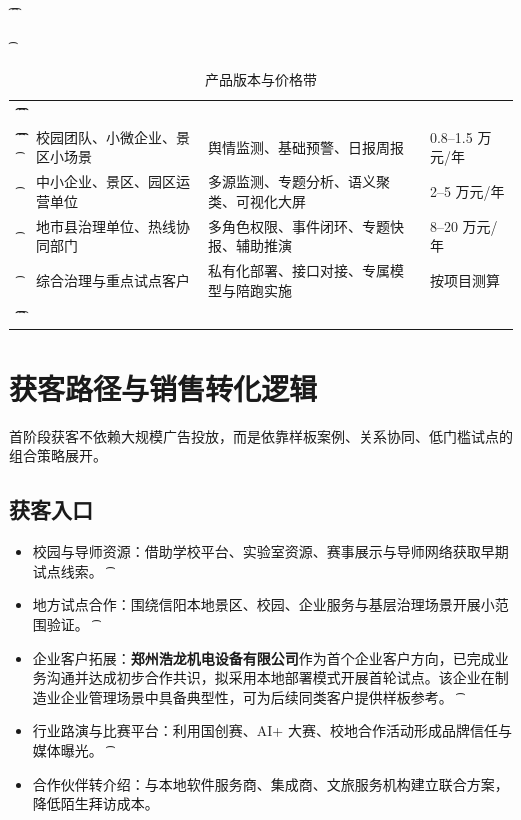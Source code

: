 \begin{table}[htbp]
	\t\centering
	\t\caption{产品版本与价格带}
	\t\begin{tabularx}{\textwidth}{|L{2.3cm}L{2.6cm}YL{2.4cm}|}
		\t\t\toprule
		\t\t{} &   &        &  \\
		\t\t\midrule
		\t\t{}
		\t{}          & 校园团队、小微企业、景区小场景 & 舆情监测、基础预警、日报周报       & 0.8--1.5 万元/年 \\
		\t{}          & 中小企业、景区、园区运营单位  & 多源监测、专题分析、语义聚类、可视化大屏 & 2--5 万元/年     \\
		\t{}          & 地市县治理单位、热线协同部门  & 多角色权限、事件闭环、专题快报、辅助推演 & 8--20 万元/年    \\
		\t{}          & 综合治理与重点试点客户     & 私有化部署、接口对接、专属模型与陪跑实施 & 按项目测算         \\
		\t\t\bottomrule
		\t\end{tabularx}
\end{table}

\section{获客路径与销售转化逻辑}

首阶段获客不依赖大规模广告投放，而是依靠样板案例、关系协同、低门槛试点的组合策略展开。

\subsection{获客入口}

\begin{itemize}[leftmargin=2em]
	\t\item 校园与导师资源：借助学校平台、实验室资源、赛事展示与导师网络获取早期试点线索。
	      \t\item 地方试点合作：围绕信阳本地景区、校园、企业服务与基层治理场景开展小范围验证。
	      \t\item 企业客户拓展：\textbf{郑州浩龙机电设备有限公司}作为首个企业客户方向，已完成业务沟通并达成初步合作共识，拟采用本地部署模式开展首轮试点。该企业在制造业企业管理场景中具备典型性，可为后续同类客户提供样板参考。
	      \t\item 行业路演与比赛平台：利用国创赛、AI+ 大赛、校地合作活动形成品牌信任与媒体曝光。
	      \t\item 合作伙伴转介绍：与本地软件服务商、集成商、文旅服务机构建立联合方案，降低陌生拜访成本。
\end{itemize}

